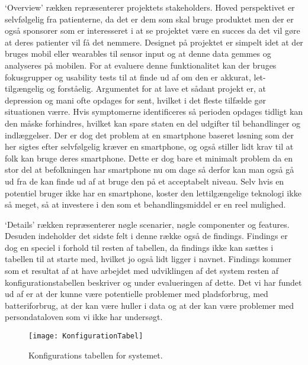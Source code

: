 `Overview' rækken repræsenterer projektets stakeholders. Hoved perspektivet er selvfølgelig fra patienterne, da det er dem som skal bruge produktet men der er også sponsorer som er interesseret i at se projektet være en succes da det vil gøre at deres patienter vil få det nemmere. 
Designet på projektet er simpelt idet at der bruges mobil eller wearables til sensor input og at denne data gemmes og analyseres på mobilen. 
For at evaluere denne funktionalitet kan der bruges fokusgrupper og usability tests til at finde ud af om den er akkurat, let-tilgængelig og forståelig.
Argumentet for at lave et sådant projekt er, at depression og mani ofte opdages for sent, hvilket i det fleste tilfælde gør situationen værre.
Hvis symptomerne identificeres så perioden opdages tidligt kan den måske forhindres, hvilket kan spare staten en del udgifter til behandlinger og indlæggelser.
Der er dog det problem at en smartphone baseret løsning som der her sigtes efter selvfølgelig kræver en smartphone, og også stiller lidt krav til at folk kan bruge deres smartphone.
Dette er dog bare et minimalt problem da en stor del at befolkningen har smartphone nu om dage så derfor kan man også gå ud fra de kan finde ud af at bruge den på et acceptabelt niveau.
Selv hvis en potentiel bruger ikke har en smartphone, koster den lettilgængelige teknologi ikke så meget, så at investere i den som et behandlingsmiddel er en reel mulighed.

`Details' rækken repræsenterer nøgle scenarier, nøgle componenter og features.
Desuden indeholder det sidste felt i denne række også de findings.
Findings er dog en speciel i forhold til resten af tabellen, da findings ikke kan sættes i tabellen til at starte med, hvilket jo også lidt ligger i navnet.
Findings kommer som et resultat af at have arbejdet med udviklingen af det system resten af konfigurationstabellen beskriver og under evalueringen af dette. 
Det vi har fundet ud af er at der kunne være potentielle problemer med pladsforbrug, med batteriforbrug, at der kan være huller i data og at der kan være problemer med persondataloven som vi ikke har undersøgt.

\begin{figure}
\texttt{[image: KonfigurationTabel]}
\caption{Konfigurations tabellen for systemet.}
\label{tab:konfigurationsTabel}
\end{figure}
